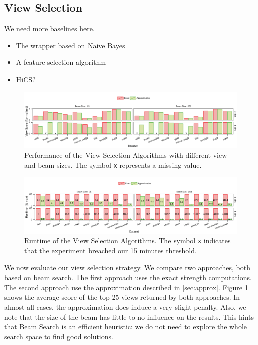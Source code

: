 \subsection{View Selection}

{\color{red}
    We need more baselines here.
    \begin{itemize}
        \item The wrapper based on Naive Bayes
        \item A feature selection algorithm
        \item HiCS?
     \end{itemize}
}


\begin{figure}[t!]
\centering
\includegraphics[width=2\columnwidth]{plots/column-select-score}
\caption{Performance of the View Selection Algorithms with different view and
beam sizes. The symbol \texttt{x} represents a missing value.}
\label{pic:column-select-score}
\end{figure}
 
\begin{figure}[t!]
\centering
\includegraphics[width=2\columnwidth]{plots/column-select-time}
\caption{Runtime of the View Selection Algorithms. The symbol \texttt{x}
indicates that the experiment breached our 15 minutes threshold.} 
\label{pic:column-select-time}
\end{figure}

We now evaluate our view selection strategy. We compare two approaches, both
based on beam search. The first approach uses the exact strength computations.
The second approach use the approximation described in \ref{sec:approx}. Figure
\ref{pic:column-select-score} shows the average score of the top 25 views
returned by both approaches. In almost all cases, the approximation does induce
a very slight penalty. Also, we note that the size of the beam has little to no
influence on the results. This hints that Beam Search is an efficient
heuristic: we do not need to explore the whole search space to find good
solutions.

